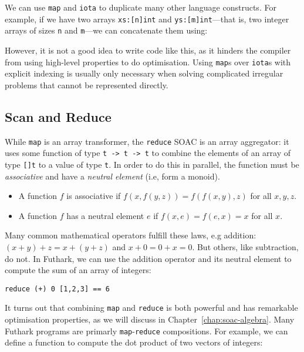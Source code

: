 \documentclass[oneside,11pt]{book}
\begin{document}
We can use \texttt{map} and \texttt{iota} to duplicate many other
language constructs.  For example, if we have two arrays
\texttt{xs:[n]int} and \texttt{ys:[m]int}---that is, two integer
arrays of sizes \texttt{n} and \texttt{m}---we can concatenate them
using:



However, it is not a good idea to write code like this, as it hinders
the compiler from using high-level properties to do optimisation.
Using \texttt{map}s over \texttt{iota}s with explicit indexing is
usually only necessary when solving complicated irregular problems
that cannot be represented directly.

\subsection{Scan and Reduce}

While \texttt{map} is an array transformer, the \texttt{reduce} SOAC
is an array aggregator: it uses some function of type \texttt{t -> t
  -> t} to combine the elements of an array of type \texttt{[]t} to a
value of type \texttt{t}.  In order to do this in parallel, the
function must be \textit{associative} and have a \textit{neutral
  element} (i.e, form a monoid).

\begin{itemize}
\item A function $f$ is associative if $f(x,f(y,z)) = f(f(x,y),z)$ for
  all $x,y,z$.
\item A function $f$ has a neutral element $e$ if
  $f(x,e) = f(e,x) = x$ for all $x$.
\end{itemize}

Many common mathematical operators fulfill these laws, e.g addition:
$(x+y)+z=x+(y+z)$ and $x+0=0+x=0$.  But others, like subtraction, do
not.  In Futhark, we can use the addition operator and its neutral
element to compute the sum of an array of integers:

\begin{lstlisting}
reduce (+) 0 [1,2,3] == 6
\end{lstlisting}

It turns out that combining \texttt{map} and \texttt{reduce} is both
powerful and has remarkable optimisation properties, as we will
discuss in Chapter~\ref{chap:soac-algebra}.  Many Futhark programs are
primarly \texttt{map}-\texttt{reduce} compositions.  For example, we
can define a function to compute the dot product of two vectors of
integers:
\end{document}

